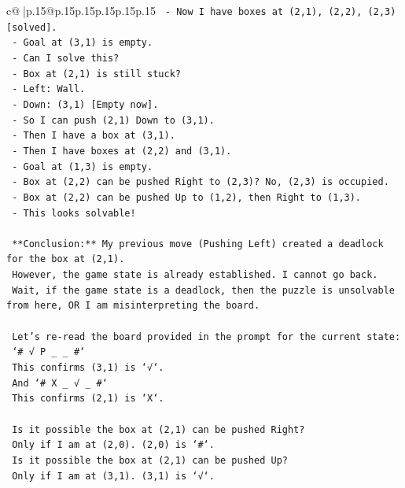 \documentclass{article}
\begin{document}
{\begin{supertabular}{c@{$\;$}|p{.15\linewidth}@{}p{.15\linewidth}p{.15\linewidth}p{.15\linewidth}p{.15\linewidth}p{.15\linewidth}}
{{{\texttt{      {-} Now I have boxes at (2,1), (2,2), (2,3){[}solved{]}.} \\
\texttt{      {-} Goal at (3,1) is empty.} \\
\texttt{      {-} Can I solve this?} \\
\texttt{      {-} Box at (2,1) is still stuck?} \\
\texttt{        {-} Left: Wall.} \\
\texttt{        {-} Down: (3,1) {[}Empty now{]}.} \\
\texttt{        {-} So I can push (2,1) Down to (3,1).} \\
\texttt{        {-} Then I have a box at (3,1).} \\
\texttt{        {-} Then I have boxes at (2,2) and (3,1).} \\
\texttt{        {-} Goal at (1,3) is empty.} \\
\texttt{        {-} Box at (2,2) can be pushed Right to (2,3)? No, (2,3) is occupied.} \\
\texttt{        {-} Box at (2,2) can be pushed Up to (1,2), then Right to (1,3).} \\
\texttt{        {-} This looks solvable!} \\
\\ 
\texttt{    **Conclusion:** My previous move (Pushing Left) created a deadlock for the box at (2,1).} \\
\texttt{    However, the game state is already established. I cannot go back.} \\
\texttt{    Wait, if the game state is a deadlock, then the puzzle is unsolvable from here, OR I am misinterpreting the board.} \\
\\ 
\texttt{    Let's re{-}read the board provided in the prompt for the current state:} \\
\texttt{    `\# √ P \_ \_ \#`} \\
\texttt{    This confirms (3,1) is `√`.} \\
\texttt{    And `\# X \_ √ \_ \#`} \\
\texttt{    This confirms (2,1) is `X`.} \\
\\ 
\texttt{    Is it possible the box at (2,1) can be pushed Right?} \\
\texttt{    Only if I am at (2,0). (2,0) is `\#`.} \\
\texttt{    Is it possible the box at (2,1) can be pushed Up?} \\
\texttt{    Only if I am at (3,1). (3,1) is `√`.} \\
}}}
\end{supertabular}}
\end{document}
